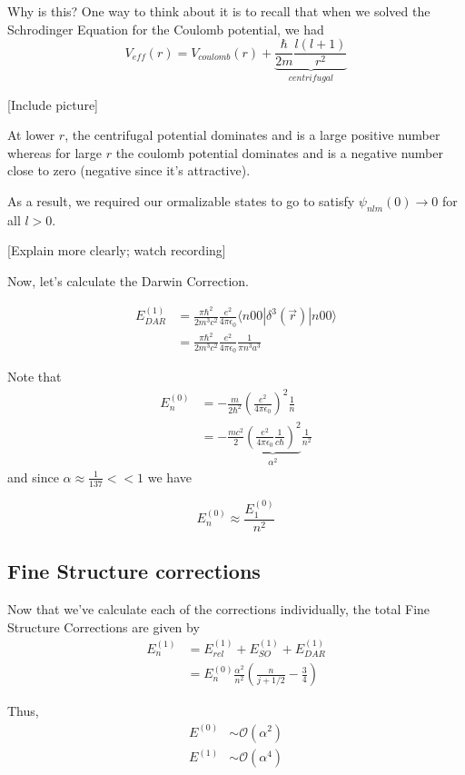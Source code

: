 \documentclass{article}
\newcommand{\inner}[2]{\langle #1 | #2 \rangle}
\begin{document}
Why is this? One way to think about it is to recall that when we solved the Schrodinger Equation for the Coulomb potential, we had 
\[ V_{eff}(r) = V_{coulomb}(r) + \underbrace{\frac{\hbar}{2m} \frac{l(l+1)}{r^2}}_{centrifugal} \]

[Include picture]

\vskip 0.5cm
At lower $r$, the centrifugal potential dominates and is a large positive number whereas for large $r$ the coulomb potential dominates and is a negative number close to zero (negative since it's attractive). 

\vskip 0.5cm
As a result, we required our ormalizable states to go to satisfy $\psi_{nlm}(0) \rightarrow 0$ for all $l > 0$.

[Explain more clearly; watch recording]

\vskip 0.5cm
Now, let's calculate the Darwin Correction. 

\begin{align*}
  E_{DAR}^{(1)} &= \frac{\pi \hbar^2}{2m^3 c^2} \frac{e^2}{4\pi \epsilon_0} \inner{n00}{\delta^3(\vec{r})|n00} \\
  &=  \frac{\pi \hbar^2}{2m^3 c^2} \frac{e^2}{4\pi\epsilon_0} \frac{1}{\pi n^3 a^3}
\end{align*}

Note that 
\begin{align*}
  E_n^{(0)} &= -\frac{m}{2\hbar^2} \left( \frac{e^2}{4\pi \epsilon_0} \right)^2 \frac{1}{n} \\
  &= -\frac{mc^2}{2} \underbrace{\left( \frac{e^2}{4\pi \epsilon_0} \frac{1}{c\hbar} \right)^2}_{\alpha^2} \frac{1}{n^2}
\end{align*}
and since $\alpha \approx \frac{1}{137} << 1$ we have 

\[ E_n^{(0)} \approx \frac{E_1^{(0)}}{n^2} \]

\subsection{Fine Structure corrections}

\vskip 0.5cm
Now that we've calculate each of the corrections individually, the total Fine Structure Corrections are given by 
\begin{align*}
  E_n^{(1)} &= E_{rel}^{(1)} + E_{SO}^{(1)} + E_{DAR}^{(1)} \\
  &= E_n^{(0)} \frac{\alpha^2}{n^2} \left( \frac{n}{j + 1/2} - \frac{3}{4} \right)
\end{align*} 

Thus, 
\begin{align*}
  E^{(0)} &\sim \mathcal{O}(\alpha^2) \\
  E^{(1)} &\sim \mathcal{O}(\alpha^4) 
\end{align*}
\end{document}
